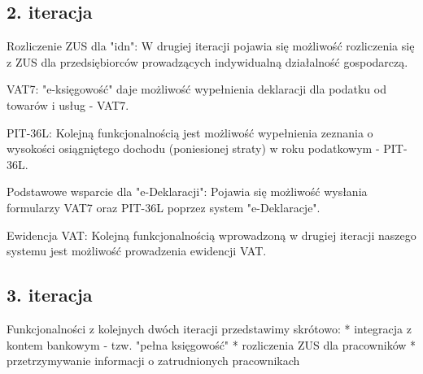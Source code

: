 \documentclass{beamer}
\begin{document}
\subsection{2. iteracja}
  \begin{frame}
    \begin{block}{}
      Rozliczenie ZUS dla "idn": W drugiej iteracji pojawia się możliwość rozliczenia się z ZUS dla przedsiębiorców prowadzących indywidualną działalność gospodarczą.
    \end{block}
  \end{frame}
  \begin{frame}
    \begin{block}{}
      VAT7: "e-księgowość" daje możliwość wypełnienia deklaracji dla podatku od towarów i usług - VAT7.
    \end{block}
  \end{frame}
  \begin{frame}
    \begin{block}{}
      PIT-36L: Kolejną funkcjonalnością jest możliwość wypełnienia zeznania o wysokości osiągniętego dochodu (poniesionej straty) w roku podatkowym - PIT-36L.
    \end{block}
  \end{frame}
  \begin{frame}
    \begin{block}{}
      Podstawowe wsparcie dla "e-Deklaracji": Pojawia się możliwość wysłania formularzy VAT7 oraz PIT-36L poprzez system "e-Deklaracje".
    \end{block}
  \end{frame}
  \begin{frame}
    \begin{block}{}
      Ewidencja VAT: Kolejną funkcjonalnością wprowadzoną w drugiej iteracji naszego systemu jest możliwość prowadzenia ewidencji VAT.
    \end{block}
  \end{frame}
\subsection{3. iteracja}
  \begin{frame}
    \begin{block}{}
      Funkcjonalności z kolejnych dwóch iteracji przedstawimy skrótowo: * integracja z kontem bankowym - tzw. "pełna księgowość" * rozliczenia ZUS dla pracowników * przetrzymywanie informacji o zatrudnionych pracownikach
    \end{block}
  \end{frame}
\end{document}
